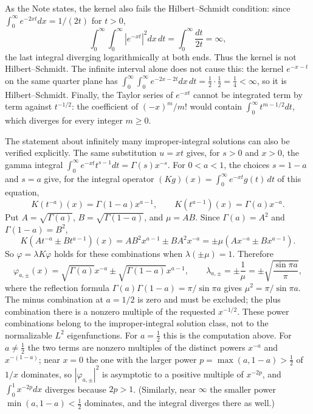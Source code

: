 As the Note states, the kernel also fails the Hilbert--Schmidt
condition: since $\int_0^\infty e^{-2xt}dx=1/(2t)$ for $t>0$,
\[
\int_0^\infty\!\!\int_0^\infty|e^{-xt}|^2dx\,dt
=\int_0^\infty\frac{dt}{2t}=\infty,
\]
the last integral diverging logarithmically at both ends.
Thus the kernel is not Hilbert--Schmidt. The infinite interval alone
does not cause this: the kernel $e^{-x-t}$ on the same quarter plane
has $\int_0^\infty\!\int_0^\infty e^{-2x-2t}dx\,dt
=\frac12\cdot\frac12=\frac14<\infty$, so it is Hilbert--Schmidt.
Finally, the Taylor series of $e^{-xt}$ cannot be integrated term by
term against $t^{-1/2}$: the coefficient of $(-x)^m/m!$ would contain
$\int_0^\infty t^{m-1/2}dt$, which diverges for every integer $m\ge0$.

The statement about infinitely many improper-integral solutions can also
be verified explicitly. The same substitution $u=xt$ gives, for $s>0$
and $x>0$, the gamma integral
$\int_0^\infty e^{-xt}t^{s-1}dt=\Gamma(s)x^{-s}$. For $0<a<1$, the
choices $s=1-a$ and $s=a$ give, for the integral operator
$(Kg)(x)=\int_0^\infty e^{-xt}g(t)\,dt$ of this equation,
\[
K(t^{-a})(x)=\Gamma(1-a)x^{a-1},\qquad
K(t^{a-1})(x)=\Gamma(a)x^{-a}.
\]
Put $A=\sqrt{\Gamma(a)}$, $B=\sqrt{\Gamma(1-a)}$, and
$\mu=AB$. Since $\Gamma(a)=A^2$ and $\Gamma(1-a)=B^2$,
\[
K(A t^{-a}\pm B t^{a-1})(x)
=AB^2x^{a-1}\pm BA^2x^{-a}
=\pm\mu(Ax^{-a}\pm Bx^{a-1}).
\]
So $\varphi=\lambda K\varphi$ holds for these combinations when
$\lambda(\pm\mu)=1$. Therefore
\[
\varphi_{a,\pm}(x)=\sqrt{\Gamma(a)}x^{-a}
\pm\sqrt{\Gamma(1-a)}x^{a-1},\qquad
\lambda_{a,\pm}=\pm\frac1\mu=\pm\sqrt{\frac{\sin\pi a}{\pi}},
\]
where the reflection formula $\Gamma(a)\Gamma(1-a)=\pi/\sin\pi a$
gives $\mu^2=\pi/\sin\pi a$.
The minus combination at $a=1/2$ is zero and must be excluded;
the plus combination there is a nonzero multiple of the requested
$x^{-1/2}$. These power combinations belong to the improper-integral
solution class, not to the normalizable $L^2$ eigenfunctions. For
$a=\frac12$ this is the computation above. For $a\ne\frac12$ the two
terms are nonzero multiples of the distinct powers $x^{-a}$ and
$x^{-(1-a)}$; near $x=0$ the one with the larger power
$p=\max(a,1-a)>\frac12$ of $1/x$ dominates, so $|\varphi_{a,\pm}|^2$ is
asymptotic to a positive multiple of $x^{-2p}$, and
$\int_0^1x^{-2p}dx$ diverges because $2p>1$. (Similarly, near $\infty$
the smaller power $\min(a,1-a)<\frac12$ dominates, and the integral
diverges there as well.)


